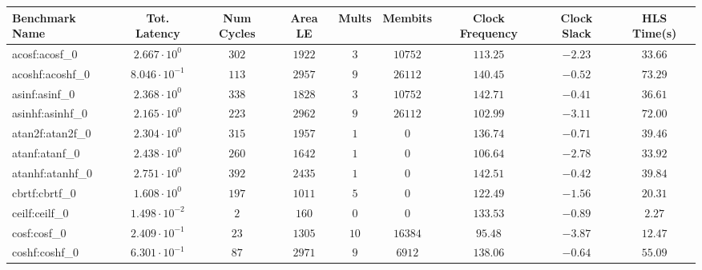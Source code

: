 \begin{tabular}{|l|c|c|c|c|c|c|c|c|}
\hline
Benchmark Name               & Tot. Latency            & Num Cycles & Area LE   & Mults   & Membits    & Clock Frequency & Clock Slack & HLS Time(s) \\
\hline
acosf:acosf\_0               & $ 2.667 \cdot 10^{0}  $ & $ 302    $ & $ 1922  $ & $ 3   $ & $ 10752  $ & $ 113.25      $ & $ -2.23   $ & $ 33.66   $ \\
acoshf:acoshf\_0             & $ 8.046 \cdot 10^{-1} $ & $ 113    $ & $ 2957  $ & $ 9   $ & $ 26112  $ & $ 140.45      $ & $ -0.52   $ & $ 73.29   $ \\
asinf:asinf\_0               & $ 2.368 \cdot 10^{0}  $ & $ 338    $ & $ 1828  $ & $ 3   $ & $ 10752  $ & $ 142.71      $ & $ -0.41   $ & $ 36.61   $ \\
asinhf:asinhf\_0             & $ 2.165 \cdot 10^{0}  $ & $ 223    $ & $ 2962  $ & $ 9   $ & $ 26112  $ & $ 102.99      $ & $ -3.11   $ & $ 72.00   $ \\
atan2f:atan2f\_0             & $ 2.304 \cdot 10^{0}  $ & $ 315    $ & $ 1957  $ & $ 1   $ & $ 0      $ & $ 136.74      $ & $ -0.71   $ & $ 39.46   $ \\
atanf:atanf\_0               & $ 2.438 \cdot 10^{0}  $ & $ 260    $ & $ 1642  $ & $ 1   $ & $ 0      $ & $ 106.64      $ & $ -2.78   $ & $ 33.92   $ \\
atanhf:atanhf\_0             & $ 2.751 \cdot 10^{0}  $ & $ 392    $ & $ 2435  $ & $ 1   $ & $ 0      $ & $ 142.51      $ & $ -0.42   $ & $ 39.84   $ \\
cbrtf:cbrtf\_0               & $ 1.608 \cdot 10^{0}  $ & $ 197    $ & $ 1011  $ & $ 5   $ & $ 0      $ & $ 122.49      $ & $ -1.56   $ & $ 20.31   $ \\
ceilf:ceilf\_0               & $ 1.498 \cdot 10^{-2} $ & $ 2      $ & $ 160   $ & $ 0   $ & $ 0      $ & $ 133.53      $ & $ -0.89   $ & $ 2.27    $ \\
cosf:cosf\_0                 & $ 2.409 \cdot 10^{-1} $ & $ 23     $ & $ 1305  $ & $ 10  $ & $ 16384  $ & $ 95.48       $ & $ -3.87   $ & $ 12.47   $ \\
coshf:coshf\_0               & $ 6.301 \cdot 10^{-1} $ & $ 87     $ & $ 2971  $ & $ 9   $ & $ 6912   $ & $ 138.06      $ & $ -0.64   $ & $ 55.09   $ \\

\end{tabular}
